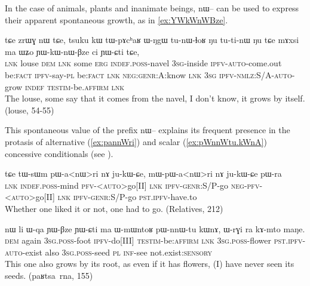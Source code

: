 \documentclass[oldfontcommands,oneside,a4paper,11pt]{article}
\newcommand{\ipa}[1]{{\phon \mbox{#1}}} %
\begin{document}
In the case of animals, plants and inanimate beings, \ipa{nɯ--} can be used to express  their apparent spontaneous growth, as in \ref{ex:YWkWnWBze}.
\begin{exe}
\ex \label{ex:YWkWnWBze}
\gll 
\ipa{tɕe} 	\ipa{zrɯɣ} 	\ipa{nɯ} 	\ipa{tɕe,} 	\ipa{tsuku} 	\ipa{kɯ} 	\ipa{tɯ-pɤcʰaʁ} 	\ipa{ɯ-ŋgɯ} 	\ipa{tu-nɯ-ɬoʁ} 	\ipa{ŋu} 	\ipa{tu-ti-nɯ} 	\ipa{ŋu} 	\ipa{tɕe} 	\ipa{mɤxsi} 	\ipa{ma} 	\ipa{ɯʑo} 	\ipa{ɲɯ-kɯ-nɯ-βze} 	\ipa{ci} 	\ipa{ɲɯ-ɕti} 	\ipa{tɕe,} 	\\
\textsc{lnk} louse \textsc{dem} \textsc{lnk} some \textsc{erg} \textsc{indef.poss}-navel \textsc{3sg}-inside \textsc{ipfv-auto}-come.out be:\textsc{fact} \textsc{ipfv}-say-\textsc{pl}  be:\textsc{fact} \textsc{lnk} \textsc{neg:genr:}A:know \textsc{lnk} \textsc{3sg} \textsc{ipfv-nmlz:S/A-auto}-grow \textsc{indef} \textsc{testim}-be.\textsc{affirm} \textsc{lnk} \\
\glt The louse, some say that it comes from the navel, I don't know, it grows by itself. (louse, 54-55)
\end{exe}

This spontaneous value of the prefix \ipa{nɯ--}  explains its frequent presence in the protasis of alternative  (\ref{ex:pannWri}) and scalar (\ref{ex:pWnnWtu.kWnA}) concessive conditionals (see \citealt{jacques14linking}).

\begin{exe}
\ex  \label{ex:pannWri}
\gll
\ipa{tɕe}  	\ipa{tɯ-sɯm}  	\ipa{pɯ-a<nɯ>ri}  	\ipa{nɤ}  	\ipa{ju-kɯ-ɕe,}  \ipa{mɯ-pɯ-a<nɯ>ri}  	\ipa{nɤ}  	\ipa{ju-kɯ-ɕe}  	\ipa{pɯ-ra}  \\
\textsc{lnk} \textsc{indef.poss}-mind  \textsc{pfv-<auto>}go[II] \textsc{lnk} \textsc{ipfv-genr}:S/P-go \textsc{neg-pfv-<auto>}go[II] \textsc{lnk} \textsc{ipfv-genr}:S/P-go \textsc{pst.ipfv}-have.to \\
\glt Whether one liked it or not, one had to go. (Relatives, 212)
\end{exe}


 \begin{exe}
\ex  \label{ex:pWnnWtu.kWnA}
\gll
\ipa{nɯ}    	\ipa{li}    	\ipa{ɯ-qa}    	\ipa{ɲɯ-βze}    	\ipa{ɲɯ-ɕti}    	\ipa{ma}    	\ipa{ɯ-mɯntoʁ}    	\ipa{pɯ-nnɯ-tu}    	\ipa{kɯnɤ,}    	\ipa{ɯ-rɣi}    	\ipa{ra}    	\ipa{kɤ-mto}    	\ipa{maŋe.}    \\
\textsc{dem} again \textsc{3sg.poss}-foot \textsc{ipfv}-do[III] \textsc{testim}-be:\textsc{affirm} \textsc{lnk} \textsc{3sg.poss}-flower \textsc{pst.ipfv-auto}-exist also \textsc{3sg.poss}-seed \textsc{pl} \textsc{inf}-see not.exist:\textsc{sensory} \\
\glt This one also grows by its root, as even if it has flowers, (I) have never seen its seeds. (\ipa{paʁtsa rna}, 155)
\end{exe}
\end{document}
